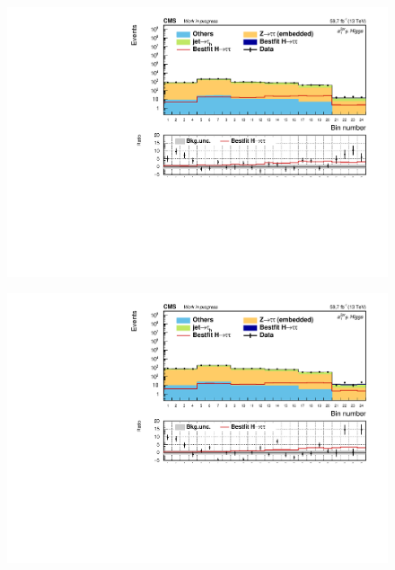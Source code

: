 \begin{figure}[!ht]
        \centering
        \includegraphics[scale=0.65]{Chapitre7/Images/histSig2018dp_postfit.pdf} 
        \vspace{0.5ex}
    \caption{}
    \label{SIGcategorydp}
\end{figure}

\begin{figure}[!ht]
        \centering
        \includegraphics[scale=0.65]{Chapitre7/Images/histSig2018pv_postfit.pdf} 
        \vspace{0.5ex}
    \caption{}
    \label{SIGcategorypv}
\end{figure}

